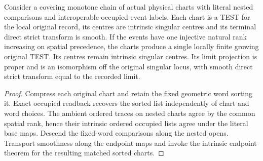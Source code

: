\begin{theorem}
\label{hir:g8-spatial-rank-proper-intrinsic-endpoint}
\leanok
Consider a covering monotone chain of actual physical charts with
literal nested comparisons and interoperable occupied event labels.
Each chart is a TEST for the local original record, its centres
are intrinsic singular centres and its terminal direct strict
transform is smooth. If the events have one injective natural
rank increasing on spatial precedence, the charts produce a
single locally finite growing original TEST. Its centres remain
intrinsic singular centres. Its limit projection is proper and
is an isomorphism off the original singular locus, with smooth
direct strict transform equal to the recorded limit.
\end{theorem}
\begin{proof}
Compress each original chart and retain the fixed geometric word
sorting it. Exact occupied readback recovers the sorted list
independently of chart and word choices. The ambient ordered
traces on nested charts agree by the common spatial rank, hence
their intrinsic ordered occupied lists agree under the literal
base maps. Descend the fixed-word comparisons along the nested
opens. Transport smoothness along the endpoint maps and invoke
the intrinsic endpoint theorem for the resulting matched sorted
charts.
\end{proof}

